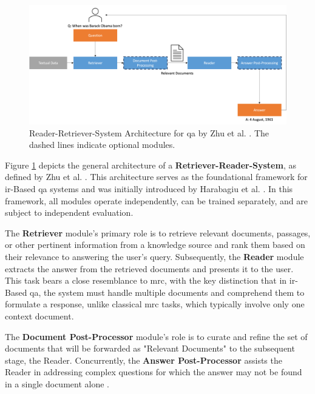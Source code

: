 \begin{figure}
    \centering
    \includegraphics[width=\textwidth]{Grafiken/Retriever_Reader.png}
    \caption{Reader-Retriever-System Architecture for \gls{qa} by Zhu et al. \cite{zhu_retrieving_2021}. The dashed lines indicate optional modules.}
    \label{fig:rr_architecture}
\end{figure}

Figure \ref{fig:rr_architecture} depicts the general architecture of a \textbf{Retriever-Reader-System}, as defined by Zhu et al. \cite{zhu_retrieving_2021}. This architecture serves as the foundational framework for \gls{ir}-Based \gls{qa} systems and was initially introduced by Harabagiu et al. \cite{harabagiu_open-domain_2003}. In this framework, all modules operate independently, can be trained separately, and are subject to independent evaluation.

The \textbf{Retriever} module's primary role is to retrieve relevant documents, passages, or other pertinent information from a knowledge source and rank them based on their relevance to answering the user's query. Subsequently, the \textbf{Reader} module extracts the answer from the retrieved documents and presents it to the user. This task bears a close resemblance to \gls{mrc}, with the key distinction that in \gls{ir}-Based \gls{qa}, the system must handle multiple documents and comprehend them to formulate a response, unlike classical \gls{mrc} tasks, which typically involve only one context document.

The \textbf{Document Post-Processor} module's role is to curate and refine the set of documents that will be forwarded as "Relevant Documents" to the subsequent stage, the Reader. Concurrently, the \textbf{Answer Post-Processor} assists the Reader in addressing complex questions for which the answer may not be found in a single document alone \cite{zhu_retrieving_2021,jurafsky_speech_2023}.


